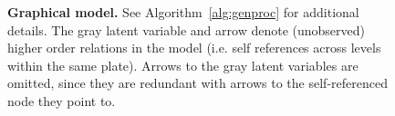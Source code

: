 \documentclass[12pt]{article}
\begin{document}
\begin{figure}
\caption{\textbf{Graphical model.}  See Algorithm~\ref{alg:genproc}
  for additional details.  The
gray latent variable and arrow denote (unobserved) higher order
relations in the model (i.e. self references across levels within the
same plate).  Arrows to the gray latent variables 
are omitted, since they are redundant with arrows to the
self-referenced node they point to.}
\label{fig:gm}
\end{figure}

\newpage

{}
\end{document}
